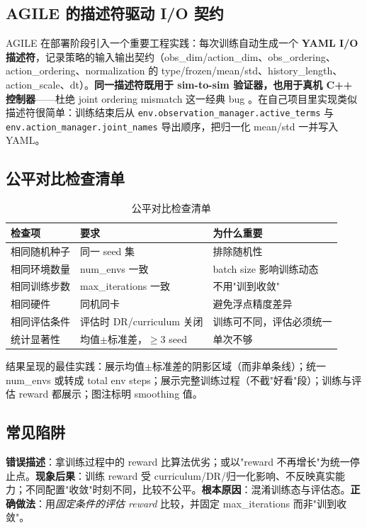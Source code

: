 \subsection{AGILE 的描述符驱动 I/O 契约}

AGILE 在部署阶段引入一个重要工程实践：每次训练自动生成一个 \textbf{YAML I/O 描述符}，记录策略的输入输出契约（obs\_dim/action\_dim、obs\_ordering、action\_ordering、normalization 的 type/frozen/mean/std、history\_length、action\_scale、dt）。\textbf{同一描述符既用于 sim-to-sim 验证器，也用于真机 C++ 控制器}——杜绝 joint ordering mismatch 这一经典 bug \cite{nvidia2026agile}。在自己项目里实现类似描述符很简单：训练结束后从 \verb|env.observation_manager.active_terms| 与 \verb|env.action_manager.joint_names| 导出顺序，把归一化 mean/std 一并写入 YAML。

\subsection{公平对比检查清单}

\begin{table}[H]
\centering
\caption{公平对比检查清单}
\label{tab:rlmc-diag-fair}
\begin{tabular}{p{3.2cm}p{4.2cm}p{4.4cm}}
\hline
检查项 & 要求 & 为什么重要 \\
\hline
相同随机种子 & 同一 seed 集 & 排除随机性 \\
相同环境数量 & num\_envs 一致 & batch size 影响训练动态 \\
相同训练步数 & max\_iterations 一致 & 不用"训到收敛" \\
相同硬件 & 同机同卡 & 避免浮点精度差异 \\
相同评估条件 & 评估时 DR/curriculum 关闭 & 训练可不同，评估必须统一 \\
统计显著性 & 均值$\pm$标准差，$\ge 3$ seed & 单次不够 \\
\hline
\end{tabular}
\end{table}

结果呈现的最佳实践：展示均值$\pm$标准差的阴影区域（而非单条线）；统一 num\_envs 或转成 total env steps；展示完整训练过程（不截"好看"段）；训练与评估 reward 都展示；图注标明 smoothing 值。

\subsection{常见陷阱}

\begin{pitfall}
\textbf{错误描述}：拿训练过程中的 reward 比算法优劣；或以"reward 不再增长"为统一停止点。\textbf{现象后果}：训练 reward 受 curriculum/DR/归一化影响、不反映真实能力；不同配置"收敛"时刻不同，比较不公平。\textbf{根本原因}：混淆训练态与评估态。\textbf{正确做法}：用\emph{固定条件的评估 reward} 比较，并固定 max\_iterations 而非"训到收敛"。
\end{pitfall}

